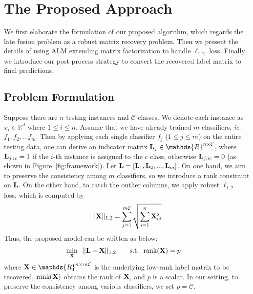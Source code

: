 \documentclass[10pt,twocolumn,letterpaper]{article}
\def\calC{{\mathcal{C}}}
\def\bL{{\bf L}}
\def\dsR{\mathds{R}}
\def\bX{{\bf X}}
\def\bX{{\bf X}}
\def\st{{\text{s.t.}}}
\def\ie{\emph{ie}}
\def\rank{{\text{rank}}}
\begin{document}
\section{The Proposed Approach}

We first elaborate the formulation of our proposed algorithm,
which regards the late fusion problem as a robust matrix recovery problem.
Then we present the details of using ALM extending matrix factorization to handle $\ell_{1,2}$ loss.
Finally we introduce our post-process strategy to convert the recovered label matrix to final predictions.

\subsection{Problem Formulation}

Suppose there are $n$ testing instances and $\calC$ classes.
We denote each instance as $x_i \in \dsR^{d}$ where $1 \leq i \leq n$.
Assume that we have already trained $m$ classifiers, \ie. $f_1, f_2, ... f_m$.
Then by applying each single classifier $f_j$ ($1 \leq j \leq m$) on the entire testing data, one can derive an indicator matrix $\bL_j \in \dsR^{n \times \calC}$, where $\bL_{j, ic} = 1$ if the $i$-th instance is assigned to the $c$ class, otherwise $\bL_{j, ic} = 0$ (as shown in Figure~\ref{fig:framework}).
Let $\bL = [ \bL_1, \bL_2, ..., \bL_m ]$.
On one hand, we aim to preserve the consistency among $m$ classifiers, so we introduce a rank constraint on $\bL$.
On the other hand, to catch the outlier columns, we apply robust $\ell_{1, 2}$ loss, which is computed by
{\small
\begin{align}
|| \bX ||_{1,2} = \sum_{j = 1}^{m\calC} \sqrt{ \sum_{i = 1}^{n} \bX_{ij}^2 }
\end{align}
}
\noindent
Thus, the proposed model can be written as below:
{\small
\begin{align}\label{eq:l12_rankconstraint}
  \min_{\bX} ~&~ || \bL - \bX ||_{1,2}~~~~~~\st~~\rank(\bX) = p
\end{align}
}
\noindent
where $\bX \in \dsR^{n \times m\calC}$ is the underlying low-rank label matrix to be recovered, $\rank(\bX)$ obtains the rank of $\bX$,
and $p$ is a scalar.
In our setting, to preserve the consistency among various classifiers, we set $p = \calC$.
\end{document}
